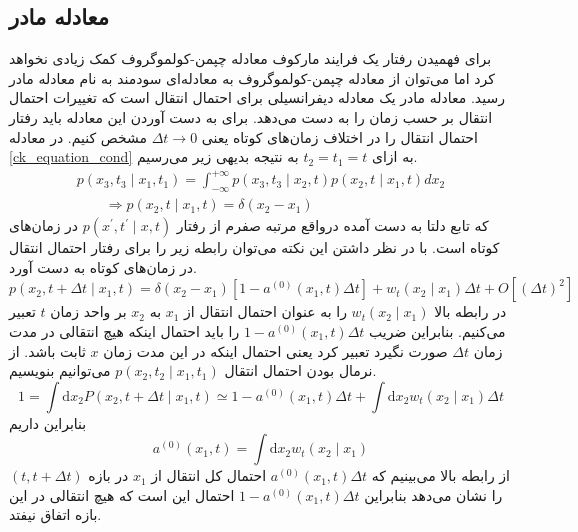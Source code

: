 \subsection{معادله مادر}

برای فهمیدن رفتار یک فرایند مارکوف معادله چپمن-کولموگروف کمک زیادی نخواهد کرد اما می‌توان از معادله چپمن-کولموگروف به معادله‌ای سودمند به نام معادله مادر رسید. 
معادله مادر یک معادله دیفرانسیلی برای احتمال انتقال است که تغییرات احتمال انتقال بر حسب زمان را به دست می‌دهد. برای به دست آوردن این معادله باید رفتار احتمال انتقال را در اختلاف زمان‌های کوتاه یعنی $\Delta t \rightarrow 0$ مشخص کنیم. در معادله \ref{ck_equation_cond} به ازای $t_2 = t_1 = t$ به نتیجه بدیهی زیر می‌رسیم.
$$
\begin{array}{l}
  p\left(x_{3} , t_{3} \mid x_{1} , t_{1}\right) = \int_{-\infty}^{+\infty} p\left(x_{3} , t_{3} \mid x_{2} , t \right) p\left(x_{2} , t \mid x_{1} , t \right) d x_{2} \\
  \qquad \Rightarrow p\left(x_{2} , t \mid x_{1} , t \right) = \delta\left( x_2 - x_1 \right) 
\end{array}
$$
که تابع دلتا به دست آمده در‌واقع مرتبه صفرم از رفتار $p(x^\prime,t^\prime \mid x,t)$ در زمان‌های کوتاه است. با در نظر داشتن این نکته می‌توان رابطه زیر را برای رفتار احتمال انتقال در زمان‌های کوتاه به دست آورد.
\begin{equation}
  p\left(x_{2}, t+\Delta t \mid x_{1}, t\right)=\delta\left(x_{2}-x_{1}\right)\left[1-a^{(0)}\left(x_{1}, t\right) \Delta t\right]+w_{t}\left(x_{2} \mid x_{1}\right) \Delta t+O\left[(\Delta t)^{2}\right]
  \label{transition_zero_order}
\end{equation}
در رابطه بالا $w_{t}(x_2 \mid x_1)$ را به عنوان احتمال انتقال از $x_{1}$ به $x_{2}$ بر واحد زمان $t$ تعبیر می‌کنیم. بنابراین ضریب $1-a^{(0)}\left(x_{1}, t\right) \Delta t$ را باید احتمال اینکه هیچ انتقالی در مدت زمان $\Delta t$ صورت نگیرد تعبیر کرد یعنی احتمال اینکه در این مدت زمان  $x$ ثابت باشد. از نرمال بودن احتمال انتقال $p(x_2,t_2 \mid x_1,t_1)$ می‌توانیم بنویسیم.
$$
1=\int \mathrm{d} x_{2} P\left(x_{2}, t+\Delta t \mid x_{1}, t\right) \simeq 1-a^{(0)}\left(x_{1}, t\right) \Delta t+\int \mathrm{d} x_{2} w_{t}\left(x_{2} \mid x_{1}\right) \Delta t
$$
بنابراین داریم
\begin{equation}
  a^{(0)}\left(x_{1}, t\right)=\int \mathrm{d} x_{2} w_{t}\left(x_{2}  \mid  x_{1}\right)
  \label{cond_moment_zero}
\end{equation}
از رابطه بالا می‌بینیم که $a^{(0)}\left(x_{1}, t\right) \Delta t$ احتمال کل انتقال از $x_{1}$ در بازه $(t,t+\Delta t)$را نشان می‌دهد بنابراین $1 - a^{(0)}\left(x_{1}, t\right) \Delta t$ احتمال این است که هیچ انتقالی در این بازه اتفاق نیفتد.

